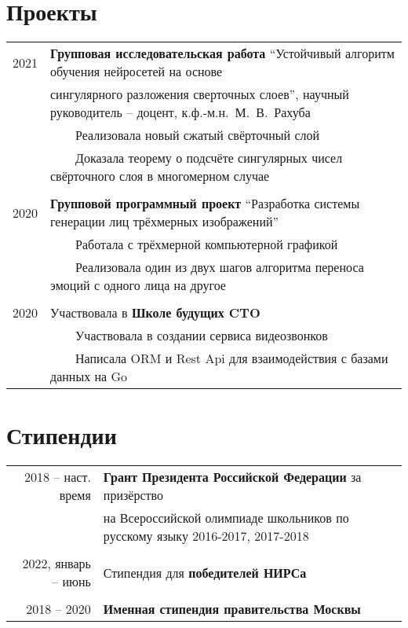 \documentclass[a4paper,10pt]{article}
\newcommand{\tabitem}{~~\llap{\textbullet}~~}
\begin{document}
\section{Проекты}
\begin{longtable}{rl}
\hspace{0.9cm} 2021 & \textbf{Групповая исследовательская работа} ``Устойчивый алгоритм обучения нейросетей на основе \\
& сингулярного разложения сверточных слоев'', научный руководитель -- доцент, к.ф.-м.н.~М.~В.~Рахуба \\
& \tabitem Реализовала новый сжатый свёрточный слой \\
& \tabitem Доказала теорему о подсчёте сингулярных чисел свёрточного слоя в многомерном случае \\
& \\
\hspace{0.9cm} 2020 & \textbf{Групповой программный проект} ``Разработка системы генерации лиц трёхмерных изображений'' \\
& \tabitem Работала с трёхмерной компьютерной графикой \\
& \tabitem Реализовала один из двух шагов алгоритма переноса эмоций с одного лица на другое\\
&\\
\hspace{0.9cm} 2020 & Участвовала в \textbf{Школе будущих CTO} \\
& \tabitem Участвовала в создании сервиса видеозвонков \\
& \tabitem Написала ORM и Rest Api для взаимодействия с базами данных на Go \\
\end{longtable}

\section{Стипендии}
\begin{tabular}{rl}
2018 -- наст. время & \textbf{Грант Президента Российской Федерации} за призёрство \\
& на Всероссийской олимпиаде школьников по русскому языку 2016-2017, 2017-2018 \\
&\\
2022, январь -- июнь & Стипендия для \textbf{победителей НИРСа}\\
&\\
2018 -- 2020 & \textbf{Именная стипендия правительства Москвы} \\
\end{tabular}
\end{document}
